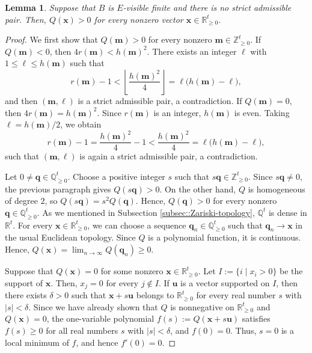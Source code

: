 \documentclass[a4,12pt]{amsart}
\numberwithin{equation}{section} %
\newtheorem{lemma}[theorem]{Lemma} %
\theoremstyle{definition} %
\begin{document}
\begin{lemma}\label{lem::no-strict-positive-Q}
Suppose that $B$ is $E$-visible finite and there is no strict admissible pair. Then, $Q(\mathbf{x})>0$ for every nonzero vector $\mathbf{x}\in\mathbb{R}_{\geq 0}^t$. 
\end{lemma}
\begin{proof}
We first show that $Q(\mathbf{m})>0$ for every nonzero $\mathbf{m}\in\mathbb{Z}_{\geq 0}^t$. If $Q(\mathbf{m})<0$, then $4r(\mathbf{m})<h(\mathbf{m})^2$. There exists an integer $\ell$ with $1\leq \ell\leq h(\mathbf{m})$ such that
\[
r(\mathbf{m})-1
<
\left\lfloor \frac{h(\mathbf{m})^2}{4}\right\rfloor
=
\ell\bigl(h(\mathbf{m})-\ell\bigr),
\]
and then $(\mathbf{m},\ell)$ is a strict admissible pair, a contradiction. If $Q(\mathbf{m})=0$, then $4r(\mathbf{m})=h(\mathbf{m})^2$. Since $r(\mathbf{m})$ is an integer, $h(\mathbf{m})$ is even. Taking $\ell=h(\mathbf{m})/2$, we obtain
\[
r(\mathbf{m})-1
=
\frac{h(\mathbf{m})^2}{4}-1
<
\frac{h(\mathbf{m})^2}{4}
=
\ell\bigl(h(\mathbf{m})-\ell\bigr),
\]
such that $(\mathbf{m},\ell)$ is again a strict admissible pair, a contradiction.

Let $0\neq \mathbf{q}\in\mathbb{Q}_{\geq 0}^t$. Choose a positive integer
$s$ such that $s\mathbf{q}\in\mathbb{Z}_{\geq 0}^t$. Since $s\mathbf{q}\neq0$, the previous paragraph gives $Q(s\mathbf{q})>0$. On the other hand, $Q$ is homogeneous of degree $2$, so $Q(s\mathbf{q})=s^2Q(\mathbf{q})$. Hence, $Q(\mathbf{q})>0$ for every nonzero $\mathbf{q}\in\mathbb{Q}_{\geq 0}^t$. As we mentioned in Subsection \ref{subsec::Zariski-topology}, $\mathbb{Q}^t$ is dense in $\mathbb{R}^t$. For every $\mathbf{x}\in\mathbb{R}_{\geq 0}^t$, we can choose a sequence
$\mathbf{q}_n\in\mathbb{Q}_{\geq 0}^t$ such that $\mathbf{q}_n\to\mathbf{x}$ in the usual Euclidean topology. Since $Q$ is a polynomial function, it is continuous. Hence, $Q(\mathbf{x})=\lim_{n\to\infty}Q(\mathbf{q}_n)\geq0$. 

Suppose that $Q(\mathbf{x})=0$ for some nonzero $\mathbf{x}\in\mathbb{R}_{\geq 0}^t$. Let $I:=\{i\mid x_i>0\}$ be the support of $\mathbf{x}$. Then, $x_j=0$ for every $j\notin I$. If $\mathbf{u}$ is a vector supported on $I$, then there exists $\delta>0$ such that $\mathbf{x}+s\mathbf{u}$ belongs to $\mathbb{R}_{\geq 0}^t$ for every real number $s$ with $|s|<\delta$. Since we have already shown that $Q$ is nonnegative on $\mathbb{R}_{\geq 0}^t$ and $Q(\mathbf{x})=0$, the one-variable polynomial $f(s):=Q(\mathbf{x}+s\mathbf{u})$ satisfies $f(s)\geq0$ for all real numbers $s$ with $|s|<\delta$, and $f(0)=0$. Thus, $s=0$ is a local minimum of $f$, and hence $f'(0)=0$.


\end{proof}
\end{document}

